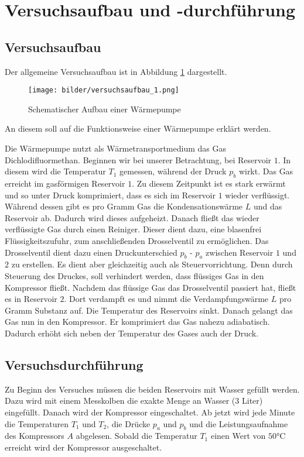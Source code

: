 \section{Versuchsaufbau und -durchführung}

\subsection{Versuchsaufbau}

Der allgemeine Versuchsaufbau ist in Abbildung \ref{fig:aufbau_warmepumpe} dargestellt.


\begin{figure}
\centering
\texttt{[image: bilder/versuchsaufbau\_1.png]}
\caption{Schematischer Aufbau einer Wärmepumpe}
\label{fig:aufbau_warmepumpe}
\end{figure}


An diesem soll auf die Funktionsweise einer Wärmepumpe erklärt werden.

Die Wärmepumpe nutzt als Wärmetransportmedium das Gas Dichlodifluormethan.
Beginnen wir bei unserer Betrachtung, bei Reservoir $1$.
In diesem wird die Temperatur $T_1$ gemessen, während der Druck $p_b$ wirkt.
Das Gas erreicht im gasförmigen Reservoir $1$. Zu diesem Zeitpunkt ist es
stark erwärmt und so unter Druck komprimiert, dass es sich im Reservoir $1$ wieder verflüssigt.
Während dessen gibt es pro Gramm Gas die Kondensationswärme $L$ und das Reservoir ab.
Dadurch wird dieses aufgeheizt.
Danach fließt das wieder verflüssigte Gas durch einen Reiniger. 
Dieser dient dazu, eine blasenfrei Flüssigkeitszufuhr, zum anschließenden 
Drosselventil zu ermöglichen. 
Das Drosselventil dient dazu einen Druckunterschied 
$p_b$ - $p_a$ zwischen Reservoir $1$ und $2$ zu erstellen.
Es dient aber gleichzeitig auch als Steuervorrichtung.
Denn durch Steuerung des Druckes, soll verhindert werden,
dass flüssiges Gas in den Kompressor fließt.
Nachdem das flüssige Gas das Drosselventil passiert hat,
fließt es in Reservoir $2$. Dort verdampft es und nimmt die Verdampfungswärme 
$L$ pro Gramm Substanz auf. Die Temperatur des Reservoirs sinkt.
Danach gelangt das Gas nun in den Kompressor. Er komprimiert das Gas nahezu adiabatisch.
Dadurch erhöht sich neben der Temperatur des Gases auch der Druck.


\subsection{Versuchsdurchführung}
Zu Beginn des Versuches müssen die beiden Reservoirs mit Wasser gefüllt werden.
Dazu wird mit einem Messkolben die exakte Menge an Wasser ($3$ Liter) eingefüllt.
Danach wird der Kompressor eingeschaltet. 
Ab jetzt wird jede Minute die Temperaturen $T_1$ und $T_2$, die Drücke $p_a$ und $p_b$ 
und die Leistungsaufnahme des Kompressors $A$ abgelesen.
Sobald die Temperatur $T_1$ einen Wert von $50\si{\degreeCelsius}$ erreicht
wird der Kompressor ausgeschaltet.

